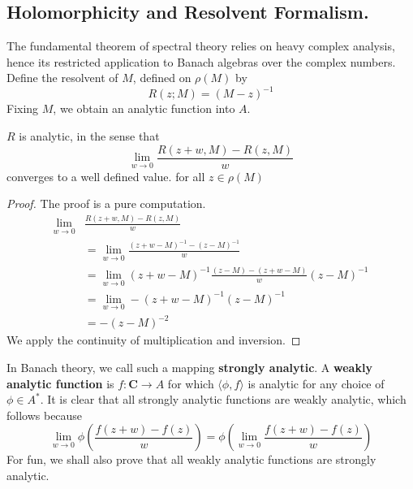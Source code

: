 \subsection{Holomorphicity and Resolvent Formalism.}

The fundamental theorem of spectral theory relies on heavy complex analysis, hence its restricted application to Banach algebras over the complex numbers. Define the resolvent of $M$, defined on $\rho(M)$ by
%
\[ R(z; M) = (M - z)^{-1} \]
%
Fixing $M$, we obtain an analytic function into $A$.

\begin{lemma}
    $R$ is analytic, in the sense that
    \[ \lim_{w \to 0} \frac{R(z + w, M) - R(z,M)}{w} \]
    converges to a well defined value. for all $z \in \rho(M)$
\end{lemma}
\begin{proof}
    The proof is a pure computation.
    \begin{align*}
        \lim_{w \to 0} &\frac{R(z + w, M) - R(z,M)}{w}\\
        &= \lim_{w \to 0} \frac{(z + w - M)^{-1} - (z - M)^{-1}}{w}\\
        &= \lim_{w \to 0} (z + w - M)^{-1} \frac{(z - M) - (z + w - M)}{w} (z - M)^{-1}\\
        &= \lim_{w \to 0} -(z + w - M)^{-1} (z - M)^{-1}\\
        &= -(z - M)^{-2}
    \end{align*}
    We apply the continuity of multiplication and inversion.
\end{proof}

In Banach theory, we call such a mapping {\bf strongly analytic}. A {\bf weakly analytic function} is $f: \mathbf{C} \to A$ for which $\langle \phi, f \rangle$ is analytic for any choice of $\phi \in A^*$. It is clear that all strongly analytic functions are weakly analytic, which follows because
%
\[ \lim_{w \to 0} \phi \left( \frac{f(z + w) - f(z)}{w} \right) = \phi \left( \lim_{w \to 0} \frac{f(z + w) - f(z)}{w} \right) \]
%
For fun, we shall also prove that all weakly analytic functions are strongly analytic.

